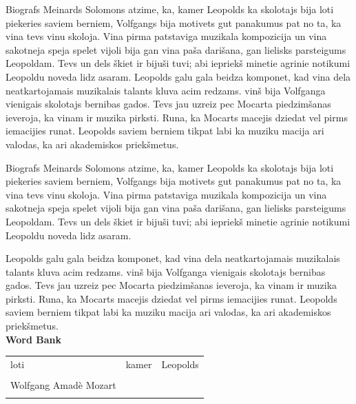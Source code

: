 \documentclass[a4paper]{article}
\begin{document}
Biografs Meinards Solomons atzime, ka, kamer Leopolds ka skolotajs bija loti piekeries saviem berniem, Volfgangs bija motivets gut panakumus pat no ta, ka vina tevs vinu skoloja. Vina pirma patstaviga muzikala kompozicija un vina sakotneja speja spelet vijoli bija gan vina paša darišana, gan lielisks parsteigums Leopoldam. Tevs un dels škiet ir bijuši tuvi; abi iepriekš minetie agrinie notikumi Leopoldu noveda lidz asaram.
Leopolds galu gala beidza komponet, kad vina dela neatkartojamais muzikalais talants kluva acim redzams. vinš bija Volfganga vienigais skolotajs bernibas gados. Tevs jau uzreiz pec Mocarta piedzimšanas ieveroja, ka vinam ir muzika pirksti. Runa, ka Mocarts macejis dziedat vel pirms iemacijies runat. Leopolds saviem berniem tikpat labi ka muziku macija ari valodas, ka ari akademiskos priekšmetus.

Biografs Meinards Solomons atzime, ka, kamer Leopolds ka skolotajs bija loti piekeries saviem berniem, Volfgangs bija motivets gut panakumus pat no ta, ka vina tevs vinu skoloja. Vina pirma patstaviga muzikala kompozicija un vina sakotneja speja spelet vijoli bija gan vina paša darišana, gan lielisks parsteigums Leopoldam. Tevs un dels škiet ir bijuši tuvi; abi iepriekš minetie agrinie notikumi Leopoldu noveda lidz asaram.

Leopolds galu gala beidza komponet, kad vina dela neatkartojamais muzikalais talants kluva acim redzams. vinš bija Volfganga vienigais skolotajs bernibas gados. Tevs jau uzreiz pec Mocarta piedzimšanas ieveroja, ka vinam ir muzika pirksti. Runa, ka Mocarts macejis dziedat vel pirms iemacijies runat. Leopolds saviem berniem tikpat labi ka muziku macija ari valodas, ka ari akademiskos priekšmetus.\\
\vspace{5mm}
\vspace{5mm}
\textbf{Word Bank}\\
\begin{table}[!th]
\begin{tabularx}{\textwidth}{X X X}
loti & kamer & Leopolds\\
 & & \\
Wolfgang Amadè Mozart
\\
\vspace{5mm}
\end{tabularx}
\end{table}
\end{document}
